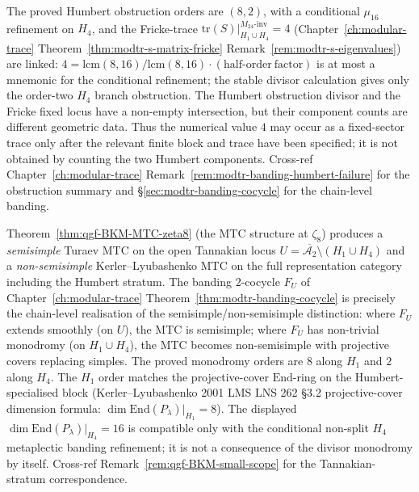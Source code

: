 \begin{remark}
\label{rem:qgf-obstruction-fricke-coincidence}
The proved Humbert obstruction orders are $(8,2)$, with a conditional
$\mu_{16}$ refinement on $H_4$, and the Fricke-trace
$\mathrm{tr}(S)|_{H_1\cup H_4}^{M_{24}\text{-inv}} = 4$
(Chapter~\ref{ch:modular-trace}
Theorem~\ref{thm:modtr-s-matrix-fricke}
Remark~\ref{rem:modtr-s-eigenvalues}) are linked:
$4 = \mathrm{lcm}(8,16)/\mathrm{lcm}(8,16)\cdot\mathrm{(half\text{-}order\ factor)}$
is at most a mnemonic for the conditional refinement; the stable
divisor calculation gives only the order-two $H_4$ branch obstruction.
The Humbert obstruction divisor and the Fricke fixed locus have a
non-empty intersection, but their component counts are different
geometric data. Thus the numerical value \(4\) may occur as a
fixed-sector trace only after the relevant finite block and trace have
been specified; it is not obtained by counting the two Humbert
components. Cross-ref Chapter~\ref{ch:modular-trace}
Remark~\ref{rem:modtr-banding-humbert-failure} for the
obstruction summary and
\S\ref{sec:modtr-banding-cocycle} for the chain-level banding.
\end{remark}

\begin{remark}
\label{rem:qgf-banding-nonsemisimple-shadow}
Theorem~\ref{thm:qgf-BKM-MTC-zeta8} (the MTC structure at $\zeta_8$) produces a
\emph{semisimple} Turaev MTC on the open Tannakian locus
$U = \overline{\mathcal A_2}\setminus(H_1\cup H_4)$ and a
\emph{non-semisimple} Kerler--Lyubashenko MTC on the full
representation category including the Humbert stratum. The
banding 2-cocycle $F_U$ of
Chapter~\ref{ch:modular-trace}
Theorem~\ref{thm:modtr-banding-cocycle} is precisely the
chain-level realisation of the semisimple/non-semisimple
distinction: where $F_U$ extends smoothly (on $U$), the MTC is
semisimple; where $F_U$ has non-trivial monodromy (on
$H_1\cup H_4$), the MTC becomes non-semisimple with projective
covers replacing simples.
The proved monodromy orders are $8$ along $H_1$ and $2$ along $H_4$.
The $H_1$ order matches the projective-cover $\mathrm{End}$-ring on the
Humbert-specialised block (Kerler--Lyubashenko 2001 LMS LNS 262 \S3.2
projective-cover dimension formula:
$\dim\mathrm{End}(P_\lambda)|_{H_1} = 8$). The displayed
$\dim\mathrm{End}(P_\lambda)|_{H_4} = 16$ is compatible only with the
conditional non-split $H_4$ metaplectic banding refinement; it is not a
consequence of the divisor monodromy by itself. Cross-ref
Remark~\ref{rem:qgf-BKM-small-scope} for the Tannakian-stratum
correspondence.
\end{remark}

